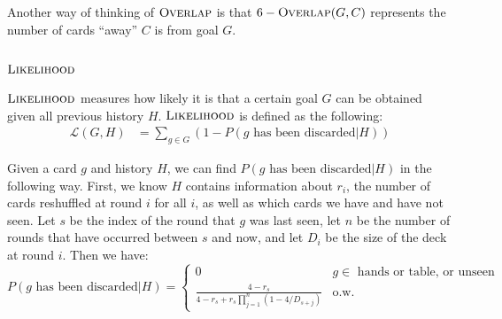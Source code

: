\documentclass[11pt]{article}
\newcommand{\overlap}{\textsc{Overlap}}
\newcommand{\lkhd}{\textsc{Likelihood}}
\begin{document}
Another way of thinking of $\overlap$ is that $6-\overlap(G,C)$ represents the number of cards ``away'' $C$ is from goal $G$.

\subsection{$\lkhd$}

$\lkhd$ measures how likely it is that a certain goal $G$ can be obtained given all previous history $H$. $\lkhd$ is defined as the following:
\begin{align}
  \mathcal{L}(G,H) &= \sum_{g \in G} (1 - P(g \text{ has been discarded}|H))
\end{align}

Given a card $g$ and history $H$, we can find $P(g \text{ has been discarded}|H)$ in the following way. First, we know $H$ contains information about $r_i$, the number of cards reshuffled at round $i$ for all $i$, as well as which cards we have and have not seen. Let $s$ be the index of the round that $g$ was last seen, let $n$ be the number of rounds that have occurred between $s$ and now, and let $D_i$ be the size of the deck at round $i$. Then we have:
\begin{equation}
P(g \text{ has been discarded}|H) = \begin{cases}
  0 & g \in \text{ hands or table, or unseen} \\
  \frac{4-r_s}{4-r_s+r_s\prod_{j=1}^n(1-4/{D_{s+j}})} & \text{o.w.}
\end{cases}
\label{eq:p-discarded} \end{equation}
\end{document}
